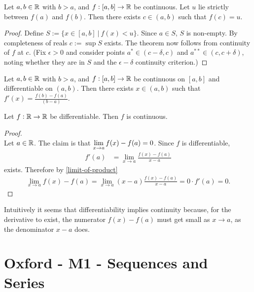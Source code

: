\begin{theorem*}
  Let $a, b \in \mathbb{R}$ with $b > a$, and $f:[a,b] \to \mathbb{R}$ be continuous. Let $u$ lie strictly between
  $f(a)$ and $f(b)$. Then there exists $c \in (a, b)$ such that $f(c) = u$.
\end{theorem*}

\begin{proof}
  Define $S := \{x \in [a, b] ~|~ f(x) < u\}$. Since $a \in S$, $S$ is non-empty. By completeness
  of reals $c := \sup S$ exists. The theorem now follows from continuity of $f$ at $c$. (Fix
  $\epsilon > 0$ and consider points $a^* \in (c - \delta, c)$ and $a^{**} \in (c, c + \delta)$,
  noting whether they are in $S$ and the $\epsilon-\delta$ continuity criterion.)
\end{proof}

\begin{theorem*}
  Let $a, b \in \mathbb{R}$ with $b > a$, and $f:[a,b] \to \mathbb{R}$ be continuous on $[a, b]$ and differentiable
  on $(a, b)$. Then there exists $x \in (a, b)$ such that $f'(x) = \frac{f(b) - f(a)}{(b - a)}$.
\end{theorem*}


\begin{theorem*}
  Let $f:\mathbb{R}\to\mathbb{R}$ be differentiable. Then $f$ is continuous.
\end{theorem*}

\begin{proof}~\\
  Let $a \in \mathbb{R}$. The claim is that $\lim\limits_{x \to a} f(x) - f(a) = 0$. Since $f$ is differentiable,
  \begin{align*}
    f'(a) &= \lim_{x \to a} \frac{f(x) - f(a)}{x - a}
  \end{align*}
  exists. Therefore by \eqref{limit-of-product}
  \begin{align*}
    \lim_{x \to a} f(x) - f(a) = \lim_{x \to a} (x - a)\frac{f(x) - f(a)}{x - a} = 0\cdot f'(a) = 0.
  \end{align*}
\end{proof}

\begin{remark*}
  Intuitively it seems that differentiability implies continuity because, for the derivative to
  exist, the numerator $f(x) - f(a)$ must get small as $x\to a$, as the denominator $x - a$ does.
\end{remark*}


\newpage
\section{Oxford - M1 - Sequences and Series}

